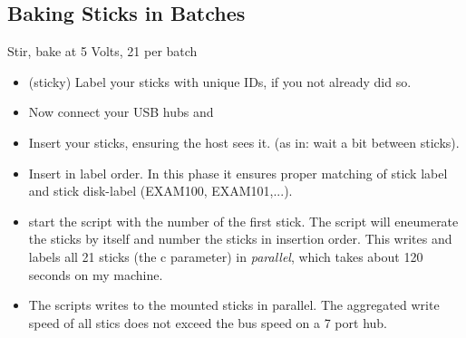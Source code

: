 \subsection[Baking]{Baking Sticks in Batches}
\begin{frame}[shrink]{Stir, bake at 5 Volts, 21 per batch}
  \begin{itemize}
  \item (sticky) Label your sticks with unique IDs, if you not already did so.
  \item Now connect your USB hubs and
  \item Insert your sticks, ensuring the host sees it. (as in: wait a
    bit between sticks).
  \item Insert in label order. In this phase it ensures proper matching of stick label and
    stick disk-label (EXAM100, EXAM101,...).
  \item start the  script with the number of the
    first stick. The script will eneumerate the sticks by itself and
    number the sticks in insertion order.
    This writes and labels all 21 sticks (the c parameter) in \textit{parallel},
    which takes about 120 seconds on my machine.
  \item The scripts writes to the mounted sticks in parallel. The
    aggregated write speed of all stics does not exceed the bus speed
    on a 7 port hub.
  \end{itemize}
\end{frame}

